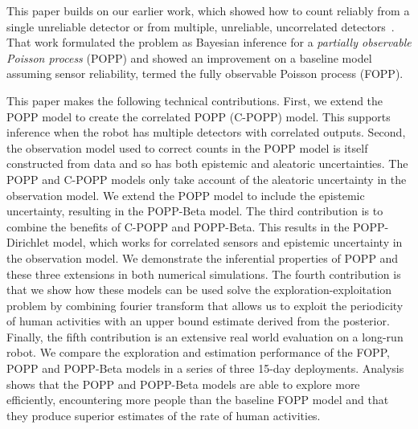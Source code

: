 This paper builds on our earlier work, which showed how to count reliably from a single unreliable detector or from multiple, unreliable, uncorrelated detectors~\cite{jovan18a}. That work formulated the problem as Bayesian inference for a \textit{partially observable Poisson process} (POPP) and showed an improvement on a baseline model assuming sensor reliability, termed the fully observable Poisson process (FOPP).

This paper makes the following technical contributions. First, we extend the POPP model to create the correlated POPP (C-POPP) model. This supports inference when the robot has multiple detectors with correlated outputs. Second, the observation model used to correct counts in the POPP model is itself constructed from data and so has both epistemic and aleatoric uncertainties. The POPP and C-POPP models only take account of the aleatoric uncertainty in the observation model. We extend the POPP model to include the epistemic uncertainty, resulting in the POPP-Beta model. The third contribution is to combine the benefits of C-POPP and POPP-Beta. This results in the POPP-Dirichlet model, which works for correlated sensors and epistemic uncertainty in the observation model. We demonstrate the inferential properties of POPP and these three extensions in both numerical simulations. The fourth contribution is that we show how these models can be used solve the exploration-exploitation problem by combining fourier transform that allows us to exploit the periodicity of human activities with an upper bound estimate derived from the posterior. %
Finally, the fifth contribution is an extensive real world evaluation on a long-run robot. We compare the exploration and estimation performance of the FOPP, POPP and POPP-Beta models in a series of three 15-day deployments. Analysis shows that the POPP and POPP-Beta models are able to explore more efficiently, encountering more people than the baseline FOPP model and that they produce superior estimates of the rate of human activities.

